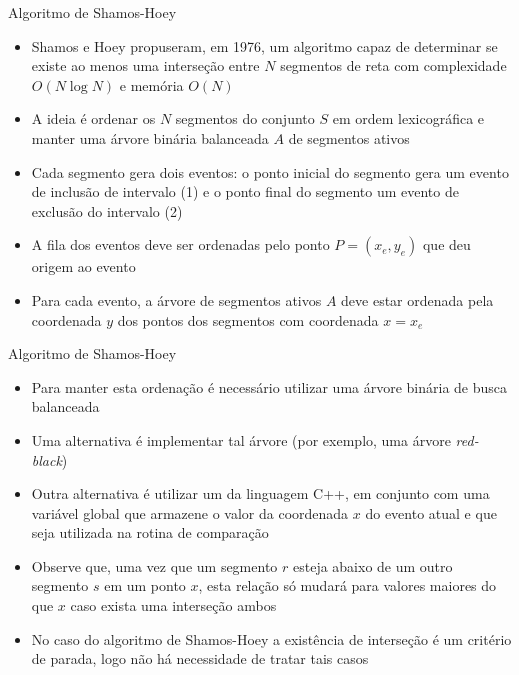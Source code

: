 \begin{frame}[fragile]{Algoritmo de Shamos-Hoey}

    \begin{itemize}
        \item Shamos e Hoey propuseram, em 1976, um algoritmo capaz de determinar se existe ao
            menos uma interseção entre $N$ segmentos de reta com complexidade $O(N\log N)$ e
            memória $O(N)$
        \pause

        \item A ideia é ordenar os $N$ segmentos do conjunto $S$ em ordem lexicográfica e manter
            uma árvore binária balanceada $A$ de segmentos ativos
        \pause

        \item Cada segmento gera dois eventos: o ponto inicial do segmento gera um evento de 
            inclusão de intervalo (1) e o ponto final do segmento um evento de exclusão do 
            intervalo (2)
        \pause

        \item A fila dos eventos deve ser ordenadas pelo ponto $P = (x_e, y_e)$ que deu origem 
            ao evento
        \pause

        \item Para cada evento, a árvore de segmentos ativos $A$ deve estar ordenada pela 
            coordenada $y$ dos pontos dos segmentos com coordenada $x = x_e$ 
    \end{itemize}

\end{frame}

\begin{frame}[fragile]{Algoritmo de Shamos-Hoey}

    \begin{itemize}
        \item Para manter esta ordenação é necessário utilizar uma árvore binária de busca
            balanceada
        \pause

        \item Uma alternativa é implementar tal árvore (por exemplo, uma árvore \textit{red-black})
        \pause

        \item Outra alternativa é utilizar um  da linguagem C++, em conjunto com
            uma variável global que armazene o valor da coordenada $x$ do evento atual e que
            seja utilizada na rotina de comparação
        \pause

        \item Observe que, uma vez que um segmento $r$ esteja abaixo de um outro segmento $s$ 
            em um ponto $x$, esta relação só mudará para valores maiores do que $x$ 
            caso exista uma interseção ambos
        \pause

        \item No caso do algoritmo de Shamos-Hoey a existência de interseção é um critério
            de parada, logo não há necessidade de tratar tais casos 
    \end{itemize}

\end{frame}

